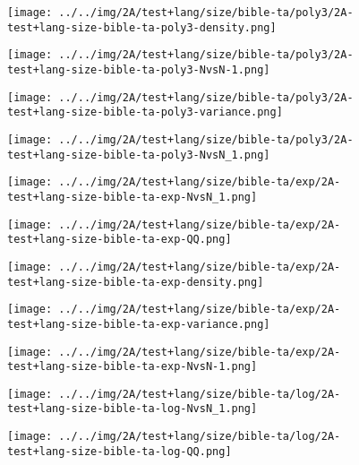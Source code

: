 \begin{figure}[H]
\centering	\texttt{[image: ../../img/2A/test+lang/size/bible-ta/poly3/2A-test+lang-size-bible-ta-poly3-density.png]}
\end{figure}
\begin{figure}[H]
\centering	\texttt{[image: ../../img/2A/test+lang/size/bible-ta/poly3/2A-test+lang-size-bible-ta-poly3-NvsN-1.png]}
\end{figure}
\begin{figure}[H]
\centering	\texttt{[image: ../../img/2A/test+lang/size/bible-ta/poly3/2A-test+lang-size-bible-ta-poly3-variance.png]}
\end{figure}
\begin{figure}[H]
\centering	\texttt{[image: ../../img/2A/test+lang/size/bible-ta/poly3/2A-test+lang-size-bible-ta-poly3-NvsN\_1.png]}
\end{figure}
\begin{figure}[H]
\centering	\texttt{[image: ../../img/2A/test+lang/size/bible-ta/exp/2A-test+lang-size-bible-ta-exp-NvsN\_1.png]}
\end{figure}
\begin{figure}[H]
\centering	\texttt{[image: ../../img/2A/test+lang/size/bible-ta/exp/2A-test+lang-size-bible-ta-exp-QQ.png]}
\end{figure}
\begin{figure}[H]
\centering	\texttt{[image: ../../img/2A/test+lang/size/bible-ta/exp/2A-test+lang-size-bible-ta-exp-density.png]}
\end{figure}
\begin{figure}[H]
\centering	\texttt{[image: ../../img/2A/test+lang/size/bible-ta/exp/2A-test+lang-size-bible-ta-exp-variance.png]}
\end{figure}
\begin{figure}[H]
\centering	\texttt{[image: ../../img/2A/test+lang/size/bible-ta/exp/2A-test+lang-size-bible-ta-exp-NvsN-1.png]}
\end{figure}
\begin{figure}[H]
\centering	\texttt{[image: ../../img/2A/test+lang/size/bible-ta/log/2A-test+lang-size-bible-ta-log-NvsN\_1.png]}
\end{figure}
\begin{figure}[H]
\centering	\texttt{[image: ../../img/2A/test+lang/size/bible-ta/log/2A-test+lang-size-bible-ta-log-QQ.png]}
\end{figure}

